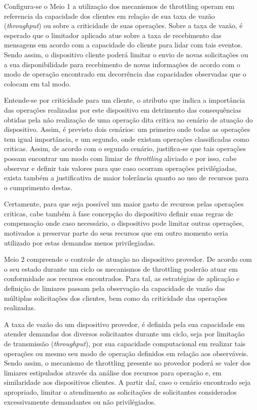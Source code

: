 Configura-se o Meio 1 a utilização dos mecanismos de throttling operam em referencia da  capacidade dos clientes em relação de sua taxa de vazão (\textit{throughput}) ou sobre a criticidade de suas operações. Sobre a taxa de vazão, é esperado que o limitador aplicado atue sobre a taxa de recebimento das mensagens em acordo com a capacidade do cliente para lidar com tais eventos. Sendo assim, o dispositivo cliente poderá limitar o envio de novas solicitações ou a sua disponibilidade para recebimento de novas informações de acordo com o modo de operação encontrado em decorrência das capacidades observadas que o colocam em tal modo.

Entende-se por criticidade para um cliente, o atributo que indica a importância das operações realizadas por este dispositivo em detrimento das consequências obtidas pela não realização de uma operação dita critica no cenário de atuação do dispositivo. Assim, é previsto dois cenários: um primeiro onde todas as operações tem igual importância, e um segundo, onde existam operações classificadas como criticas. Assim, de acordo com o segundo cenário, justifica-se que tais operações possam encontrar um modo com limiar de \textit{throttling} aliviado e por isso, cabe observar e definir tais valores para que caso ocorram operações privilégiadas, exista também a justificativa de maior tolerância quanto ao uso de recursos para o cumprimento destas. 

Certamente, para que seja possível um maior gasto de recursos pelas operações criticas, cabe também à fase concepção do dispositivo definir suas regras de compensação onde caso necessário, o dispositivo pode limitar outras operações, motivados a preservar parte do seus recursos que em outro momento seria utilizado por estas demandas menos privilegiadas.

Meio 2 compreende o controle de atuação no dispositivo provedor. De acordo com o seu estado durante um ciclo os mecanismos de throttling poderão atuar em conformidade aos recursos encontrados. Para tal, as estratégias de aplicação e definição de limiares passam pela observação da capacidade de vazão das múltiplas solicitações dos clientes, bem como da criticidade das operações realizadas. 

A taxa de vazão do um dispositivo provedor, é definida pela sua capacidade em atender demandas dos diversos solicitantes durante um ciclo, seja por limitação de transmissão (\textit{throughput}), por sua capacidade computacional em realizar tais operações ou mesmo seu modo de operação definidos em relação aos observáveis. Sendo assim, o mecanismo de throttling presente no provedor poderá se valer dos limiares estipulados através da análise dos recursos para operação e, em similaridade aos dispositivos clientes. A partir daí, caso o cenário encontrado seja apropriado, limitar o atendimento as solicitações de solicitantes considerados excessivamente demandantes ou não privilégiados.  

